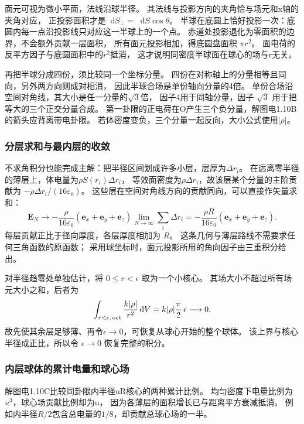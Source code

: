 \documentclass[UTF8,fontset=fandol,a4paper,11pt]{ctexart}
\newcommand{\dd}{\mathop{}\!\mathrm{d}}
\newcommand{\vect}[1]{\bm{#1}}
\begin{document}
面元可视为微小平面，法线沿球半径。
其法线与投影方向的夹角恰与场元和x轴的夹角对应，
正投影面积才是$\dd S_\perp=\dd S\cos\theta$。
半球在底圆上恰好投影一次：底圆内每一点沿投影线只对应这一半球上的一个点。
赤道处投影退化为零面积的边界，不会额外贡献一层面积，
所有面元投影相加，得底圆盘面积 $\pi r^2$。
面电荷的反平方因子与底圆面积中的$r^2$抵消，
这才说明同密度半球面在球心的场与r无关。

再把半球分成四份，须比较同一个坐标分量。
四份在对称轴上的分量相等且同向，另外两方向则成对相消，
因此半球合场是单份轴向分量的4倍。
单份合场沿空间对角线，其大小是任一分量的$\sqrt3$倍，
因子4用于同轴分量，因子 $\sqrt3$ 用于把等大的三个正交分量合成。
第一卦限的正电荷在O产生三个负分量，解图电1.10B的箭头应背离带电卦限。
若体密度变负，三个分量一起反向，大小公式使用$|\rho|$。

\subsubsection*{分层求和与最内层的收敛}
不求角积分也能完成主解：把半径区间划成许多小层，层厚为$\Delta r_i$。
在远离零半径的薄层上，体电量为$\rho S(r_i)\Delta r_i$，
等效面密度为$\rho\Delta r_i$，故该层某个分量的主阶贡献为
$-\rho\Delta r_i/(16\varepsilon_0)$。
这些层在空间对角线方向的贡献同向，可以直接作矢量求和：
\[
\vect E_N\longrightarrow-\frac{\rho}{16\varepsilon_0}
(\vect e_x+\vect e_y+\vect e_z)\lim_{N\to\infty}\sum_i\Delta r_i
=-\frac{\rho R}{16\varepsilon_0}(\vect e_x+\vect e_y+\vect e_z).
\]
每层贡献正比于径向厚度，各层厚度相加为 $R$。
这条几何与薄层路线不需要求任何三角函数的原函数；
采用球坐标时，面元投影所用的角向因子由三重积分给出。

对半径趋零处单独估计，将 $0\le r<\epsilon$ 取为一个小核心。
其场大小不超过所有场元大小之和，后者为
\[
\int_{r<\epsilon,\,\rm oct}\frac{k|\rho|}{r^2}\dd V
=k|\rho|\frac\pi2\,\epsilon\longrightarrow0.
\]
故先使其余层足够薄、再令$\epsilon\to0$，可恢复从球心开始的整个球体。
该上界与核心半径成正比，所以令 $\epsilon\to0$ 恢复完整的积分。

\subsubsection*{内层球体的累计电量和球心场}
解图电1.10C比较同卦限内半径uR核心的两种累计比例。
均匀密度下电量比例为$u^3$，球心场贡献比例却为u，
因为各薄层的面积增长已与距离平方衰减抵消。
例如内半径$R/2$包含总电量的$1/8$，却贡献总球心场的一半。
\end{document}
